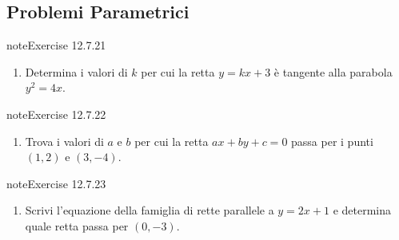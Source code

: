\documentclass[letterpaper,10pt,italian]{jupyterBook}
\begin{document}
\subsection{Problemi Parametrici}
\label{\detokenize{ch/analytic_geometry/analytic_geometry_2d/problems:problemi-parametrici}} \label{exercise:ch/analytic_geometry/analytic_geometry_2d/problems-exercise-20}

\begin{sphinxadmonition}{note}{Exercise 12.7.21}


\begin{enumerate}
%
\setcounter{enumi}{20}
\item {} 
\sphinxAtStartPar
Determina i valori di \( k \) per cui la retta \( y = kx + 3 \) è tangente alla parabola \( y^2 = 4x \).

\end{enumerate}
\end{sphinxadmonition}
 \label{exercise:ch/analytic_geometry/analytic_geometry_2d/problems-exercise-21}

\begin{sphinxadmonition}{note}{Exercise 12.7.22}


\begin{enumerate}
%
\setcounter{enumi}{21}
\item {} 
\sphinxAtStartPar
Trova i valori di \( a \) e \( b \) per cui la retta \( ax + by + c = 0 \) passa per i punti \( (1, 2) \) e \( (3, -4) \).

\end{enumerate}
\end{sphinxadmonition}
 \label{exercise:ch/analytic_geometry/analytic_geometry_2d/problems-exercise-22}

\begin{sphinxadmonition}{note}{Exercise 12.7.23}


\begin{enumerate}
%
\setcounter{enumi}{22}
\item {} 
\sphinxAtStartPar
Scrivi l’equazione della famiglia di rette parallele a \( y = 2x + 1 \) e determina quale retta passa per \( (0, -3) \).

\end{enumerate}
\end{sphinxadmonition}
 \label{exercise:ch/analytic_geometry/analytic_geometry_2d/problems-exercise-23}
\end{document}

